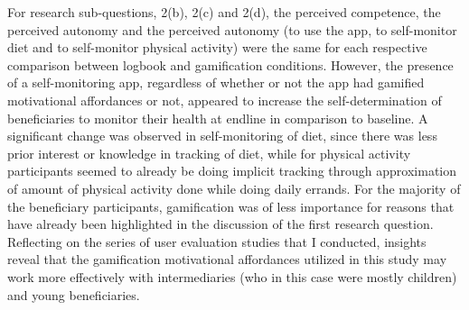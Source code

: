 For research sub-questions, 2(b), 2(c) and 2(d), the perceived competence, the perceived autonomy and the perceived autonomy (to use the app, to self-monitor diet and to self-monitor physical activity) were the same for each respective comparison between logbook and gamification conditions. However, the presence of a self-monitoring app, regardless of whether or not the app had gamified motivational affordances or not, appeared to increase the self-determination of beneficiaries to monitor their health at endline in comparison to baseline. A significant change was observed in self-monitoring of diet, since there was less prior interest or knowledge in tracking of diet, while for physical activity participants seemed to already be doing implicit tracking through approximation of amount of physical activity done while doing daily errands. For the majority of the beneficiary participants, gamification was of less importance for reasons that have already been highlighted in the discussion of the first research question. Reflecting on the series of user evaluation studies that I conducted, insights reveal that the gamification motivational affordances utilized in this study may work more effectively with intermediaries (who in this case were mostly children) and young beneficiaries. 

